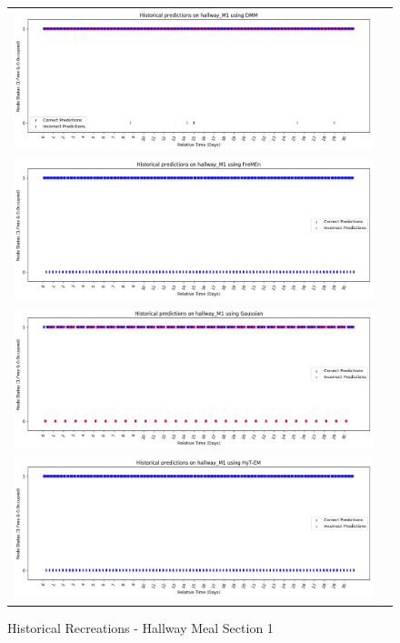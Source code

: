 \begin{figure}[!Hp]
  \begin{tabular}{cc}
    {\includegraphics[width = 6in]{images/results/Historical_hallway_M1_DMM.png}} \\
    {\includegraphics[width = 6in]{images/results/Historical_hallway_M1_FreMEn.png}} \\
    {\includegraphics[width = 6in]{images/results/Historical_hallway_M1_Gaussian.png}} \\
    {\includegraphics[width = 6in]{images/results/Historical_hallway_M1_HyT-EM.png}} \\
  \end{tabular}
  \caption{Historical Recreations - Hallway Meal Section 1}
\end{figure}

